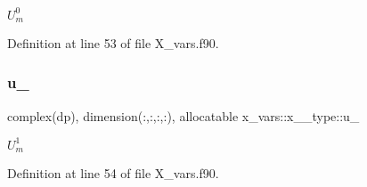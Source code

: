 $U_m^0$ 



Definition at line 53 of file X\+\_\+vars.\+f90.

\mbox{\label{structx__vars_1_1x__1__type_ab5cb4ea2b358b6787b84ffccdbc65dab}} 
\subsubsection{\texorpdfstring{u\+\_}{u\_1}}
{\footnotesize\ttfamily complex(dp), dimension(\+:,\+:,\+:,\+:), allocatable x\+\_\+vars\+::x\+\_\+\_\+type\+::u\+\_}



$U_m^1$ 



Definition at line 54 of file X\+\_\+vars.\+f90.



